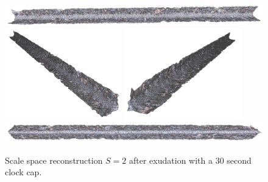 \documentclass[12pt]{drexelthesis}
\begin{document}
\begin{figure}[!ht]
	\centering
		\includegraphics[width=5in]{simulated-lab-scan/0noise/optimizedNeat/scalespace2everything00.png}
		\includegraphics[width=2in]{simulated-lab-scan/0noise/optimizedNeat/scalespace2everything01.png}
		\includegraphics[width=2in]{simulated-lab-scan/0noise/optimizedNeat/scalespace2everything02.png}
		\includegraphics[width=5in]{simulated-lab-scan/0noise/optimizedNeat/scalespace2everything03.png}
		\caption[Scale space reconstruction $S = 2$ after exudation with a 30 second clock cap]{\centering Scale space reconstruction $S = 2$ after exudation with a 30 second clock cap.}
	\label{zeronoise:scalespace2everything}
\end{figure}
\end{document}
